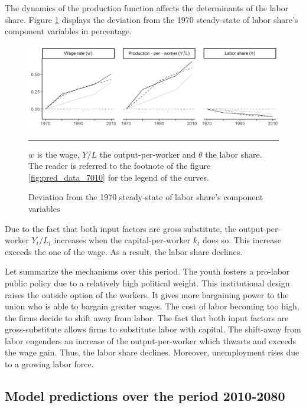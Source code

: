 The dynamics of the production function affects the determinants of the labor share. Figure \ref{fig:dev_laborshare_7010} displays the deviation from the 1970 steady-state of labor share's component variables in percentage.
\begin{figure}[tb]
	\centering
	\includegraphics[width=1\linewidth]{../result/deviation/dev_laborshare7010.png}
	\caption{Deviation from the 1970 steady-state of labor share's component variables}
	\label{fig:dev_laborshare_7010}
	\vspace{.5ex}
	\hrule
	\vspace{-4ex}
	\justify\singlespacing\footnotesize $w$ is the wage, $Y/L$ the output-per-worker and $\theta$ the labor share. The reader is referred to the footnote of the figure \ref{fig:pred_data_7010} for the legend of the curves.
\end{figure}
Due to the fact that both input factors are gross substitute, the output-per-worker $Y_t/L_t$ increases when the capital-per-worker $k_t$ does so. This increase exceeds the one of the wage. As a result, the labor share declines.

Let summarize the mechanisms over this period. The youth fosters a pro-labor public policy due to a relatively high political weight. This institutional design raises the outside option of the workers. It gives more bargaining power to the union who is able to bargain greater wages. The cost of labor becoming too high, the firms decide to shift away from labor. The fact that both input factors are gross-substitute allows firms to substitute labor with capital. The shift-away from labor engenders an increase of the output-per-worker which thwarts and exceeds the wage gain. Thus, the labor share declines. Moreover, unemployment rises due to a growing labor force.

\subsection{Model predictions over the period 2010-2080}

